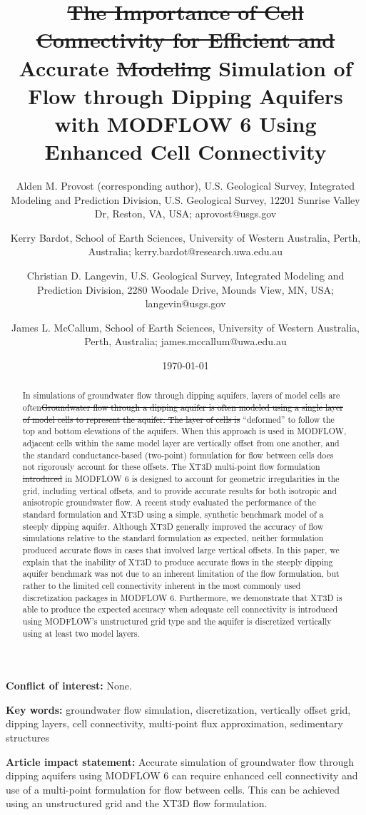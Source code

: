 \documentclass{article}
\title{{\color{red} \sout{The Importance of Cell Connectivity for Efficient and }}Accurate {\color{red} \sout{Modeling} Simulation} of Flow through Dipping Aquifers with MODFLOW 6 {\color{red} Using Enhanced Cell Connectivity}}
\author{
	Alden M. Provost {\color{red} (corresponding author)}, U.S. Geological Survey, Integrated Modeling and Prediction Division, U.S. Geological Survey, 12201 Sunrise Valley Dr, Reston, VA, USA{\color{red}; aprovost@usgs.gov} \\
	\and 
	Kerry Bardot, School of Earth Sciences, University of Western Australia, Perth, Australia{\color{red}; kerry.bardot@research.uwa.edu.au} \\
	\and 
	Christian D. Langevin, U.S. Geological Survey, Integrated Modeling and Prediction Division, 2280 Woodale Drive, Mounds View, MN, USA{\color{red}; langevin@usgs.gov} \\
	\and 
	James L. McCallum, School of Earth Sciences, University of Western Australia, Perth, Australia{\color{red}; james.mccallum@uwa.edu.au} \\
	}
\date{\today}
\begin{document}

{\let\newpage\relax\maketitle}

\textbf{Conflict of interest:} None.

\textbf{Key words:} groundwater flow simulation, discretization, vertically offset grid, dipping layers, cell connectivity, multi-point flux approximation, sedimentary structures

\textbf{Article impact statement:} Accurate simulation of groundwater flow through dipping aquifers using MODFLOW 6 can require enhanced cell connectivity and use of a multi-point formulation for flow between cells. This can be achieved using an unstructured grid and the XT3D flow formulation.

\begin{abstract}

{\color{red} In simulations of groundwater flow through dipping aquifers, layers of model cells are often\sout{Groundwater flow through a dipping aquifer is often modeled using a single layer of model cells to represent the aquifer. The layer of cells is }}``deformed'' to follow the top and bottom elevations of the aquifer{\color{red}s}. When this approach is used in MODFLOW, adjacent cells within the {\color{red} same} model layer are vertically offset from one another, and the standard conductance-based (two-point) formulation for flow between cells does not rigorously account for these offsets. The XT3D multi-point flow formulation {\color{red} \sout{introduced }}in MODFLOW 6 is designed to account for geometric irregularities in the grid, including vertical offsets, and to provide accurate results for both isotropic and anisotropic groundwater flow.  A recent study evaluated the performance of the standard formulation and XT3D using a simple, synthetic benchmark model of a steeply dipping aquifer. Although XT3D generally improved the accuracy of flow simulations relative to the standard formulation as expected, neither formulation produced accurate flows in cases that involved large vertical offsets. In this paper, we explain that the inability of XT3D to produce accurate flows in the steeply dipping aquifer benchmark was not due to an inherent limitation of the flow formulation, but {\color{red} rather} to the limited cell connectivity inherent in the most commonly used discretization packages in MODFLOW 6. Furthermore, we demonstrate that XT3D is able to produce the expected accuracy when adequate cell connectivity is introduced using MODFLOW's unstructured grid type and the aquifer is discretized vertically using at least two model layers.

\end{abstract}
\end{document}
